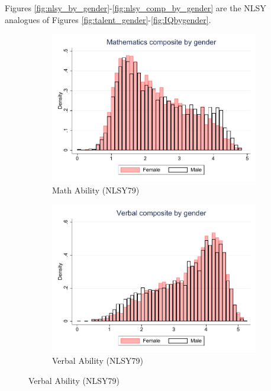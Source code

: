 \documentclass[onehalfspacing,11pt]{article}
\begin{document}
Figures \ref{fig:nlsy_by_gender}-\ref{fig:nlsy_comp_by_gender} are the NLSY analogues of Figures \ref{fig:talent_gender}-\ref{fig:IQbygender}.

\begin{figure}
	\begin{subfigure}{0.49\textwidth}
		\includegraphics[width=\linewidth]{NLSY79_Mathematics_gender.pdf}
		\caption{Math Ability (NLSY79)} \label{fig:nlsy79math}
	\end{subfigure}
	\hspace*{\fill} %
	\begin{subfigure}{0.49\textwidth}
		\includegraphics[width=\linewidth]{NLSY79_Verbal_gender.pdf}
		\caption{Verbal Ability (NLSY79)} \label{fig:nlsy79word}
	\end{subfigure}

\end{figure}
\end{document}
